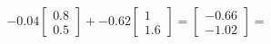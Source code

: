 \documentclass[preview]{standalone}
\begin{document}
\begin{align*}
-0.04 \begin{bmatrix} 0.8 \\ 0.5 \end{bmatrix} + -0.62 \begin{bmatrix} 1 \\ 1.6 \end{bmatrix} = \begin{bmatrix} -0.66 \\ -1.02 \end{bmatrix} =
\end{align*}
\end{document}
